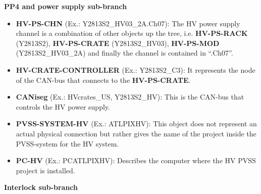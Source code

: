 \noindent \hspace{0.2cm} {\bf \normalsize PP4 and power supply sub-branch}
%
\begin{itemize}
\item {\bf HV-PS-CHN} (Ex.: Y2813S2\_HV03\_2A.Ch07): The HV power supply channel is a combination of other objects up the tree,
i.e. {\bf HV-PS-RACK} (Y2813S2), {\bf HV-PS-CRATE} (Y2813S2\_HV03), {\bf HV-PS-MOD} (Y2813S2\_HV03\_2A) and finally the 
channel is contained in ``.Ch07''.
\item {\bf HV-CRATE-CONTROLLER} (Ex.: Y2813S2\_C3): It represents the node of the CAN-bus that connects to the {\bf HV-PS-CRATE}.  
\item {\bf CANiseg} (Ex.: HVcrates\_US, Y2813S2\_HV): This is the CAN-bus that controls the HV power supply.  
\item {\bf PVSS-SYSTEM-HV} (Ex.: ATLPIXHV): This object does not represent an actual physical connection but
rather gives the name of the project inside the PVSS-system for the HV system. 
\item {\bf PC-HV} (Ex.: PCATLPIXHV): Describes the computer where the HV PVSS project is installed.
\end{itemize}

\noindent \hspace{0.2cm} {\bf \normalsize Interlock sub-branch}

\vspace{0.3cm}

